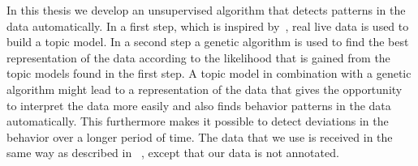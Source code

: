 \documentclass[11pt,a4paper]{article}
\begin{document}
In this thesis we develop an unsupervised algorithm that detects patterns in the data automatically.
In a first step, which is inspired by~\cite{farrahi2008daily}, real live data is used to build a topic model. In a second step a genetic algorithm is used to find the best representation of the data according to the likelihood that is gained from the topic models found in the first step. 
 A topic model in combination with a genetic algorithm might lead to a representation of the data that gives the opportunity to interpret the data more easily and also finds behavior patterns in the data automatically. This furthermore makes it possible to detect deviations in the behavior over a longer period of time. The data that we use is received in the same way as described in ~\cite{van2010activity}, except that our data is not annotated.\\
\end{document}

